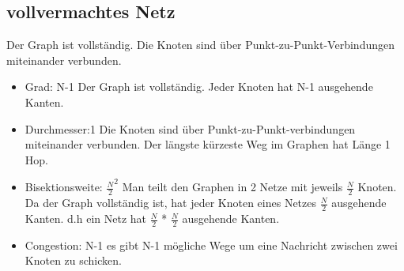 \subsection{vollvermachtes Netz}
Der Graph ist vollständig. Die Knoten sind über Punkt-zu-Punkt-Verbindungen miteinander verbunden.
\begin{itemize}
  \item Grad: N-1
  \newline Der Graph ist vollständig. Jeder Knoten hat N-1 ausgehende Kanten.
  \item Durchmesser:1
   \newline Die Knoten sind über Punkt-zu-Punkt-verbindungen miteinander verbunden. Der längste kürzeste Weg  im Graphen hat Länge 1 Hop.
  \item Bisektionsweite: 
$ \frac{N}{2}^2$
  \newline Man teilt den Graphen in 2 Netze mit jeweils $\frac{N}{2}$ Knoten. Da der Graph vollständig ist, hat jeder Knoten eines Netzes  $\frac{N}{2}$ ausgehende Kanten. d.h ein Netz hat $\frac{N}{2}$ * $\frac{N}{2}$ ausgehende Kanten. 
  \item Congestion: N-1
  \newline es gibt N-1 mögliche Wege um eine Nachricht zwischen zwei Knoten zu schicken.
\end{itemize}
